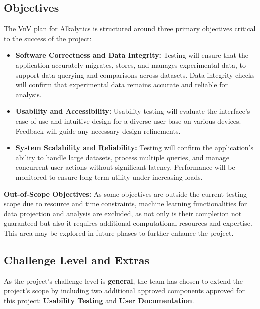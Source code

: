 \documentclass[12pt, titlepage]{article}
\begin{document}
\subsection{Objectives}

The VnV plan for Alkalytics is structured around three primary objectives
critical to the success of the project:

\begin{itemize}
  \item \textbf{Software Correctness and Data Integrity:} Testing will ensure
  that the application accurately migrates, stores, and manages experimental
  data, to support data querying and comparisons across datasets. Data integrity
  checks will confirm that experimental data remains accurate and reliable for
  analysis.

  \item \textbf{Usability and Accessibility:} Usability testing will evaluate
  the interface's ease of use and intuitive design for a diverse user base on
  various devices. Feedback will guide any necessary design refinements.
  
  \item \textbf{System Scalability and Reliability:} Testing will confirm the
  application's ability to handle large datasets, process multiple queries, and
  manage concurrent user actions without significant latency. Performance will
  be monitored to ensure long-term utility under increasing loads.
  
\end{itemize}

\noindent \textbf{Out-of-Scope Objectives:} As some objectives are outside the
current testing scope due to resource and time constraints, machine learning
functionalities for data projection and analysis are excluded, as not only is
their completion not guaranteed but also it requires additional computational
resources and expertise. This area may be explored in future phases to further
enhance the project.


\subsection{Challenge Level and Extras}

As the project's challenge level is \textbf{general}, the team has chosen to
extend the project's scope by including two additional approved components
approved for this project: \textbf{Usability Testing} and \textbf{User
Documentation}.
\newline
\end{document}
